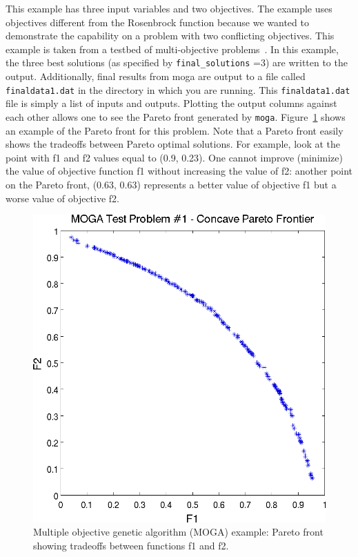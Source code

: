 This example has three input variables and two objectives.
The example uses objectives different from the Rosenbrock
function because we wanted to demonstrate the capability on a problem
with two conflicting objectives.  This example is taken from a testbed
of multi-objective problems~\cite{Coe02}. In this example, the three best solutions (as specified by \texttt{final\_solutions} =3) are written to the output.  Additionally, final results from moga
are output to a file called \texttt{finaldata1.dat} in the directory in
which you are running. This \texttt{finaldata1.dat} file is simply a
list of inputs and outputs. Plotting the output columns against each
other allows one to see the Pareto front generated by \texttt{moga}.
Figure~\ref{tutorial:moga_pareto} shows an example of the Pareto
front for this problem. Note that a Pareto front easily shows the
tradeoffs between Pareto optimal solutions.  For example, look at the
point with f1 and f2 values equal to (0.9, 0.23). One cannot improve
(minimize) the value of objective function f1 without increasing the
value of f2: another point on the Pareto front, (0.63, 0.63) represents
a better value of objective f1 but a worse value of objective f2.
\begin{figure}[ht!]
  \centering
  \includegraphics[scale=0.75]{images/dakota_mogatest1_pareto_front}
  \caption{Multiple objective genetic algorithm (MOGA) example: Pareto
  front showing tradeoffs between functions f1 and f2.}
  \label{tutorial:moga_pareto}
\end{figure}

